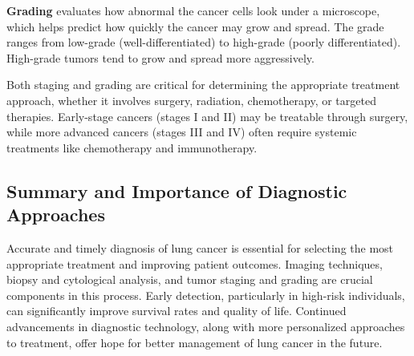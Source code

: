 \textbf{Grading} evaluates how abnormal the cancer cells look under a microscope, which helps predict 
how quickly the cancer may grow and spread. The grade ranges from low-grade (well-differentiated) 
to high-grade (poorly differentiated). High-grade tumors tend to grow and spread more aggressively.

Both staging and grading are critical for determining the appropriate treatment approach, whether it 
involves surgery, radiation, chemotherapy, or targeted therapies. Early-stage cancers (stages I and 
II) may be treatable through surgery, while more advanced cancers (stages III and IV) often require 
systemic treatments like chemotherapy and immunotherapy.


\subsection{Summary and Importance of Diagnostic Approaches}

Accurate and timely diagnosis of lung cancer is essential for selecting the most appropriate 
treatment and improving patient outcomes. Imaging techniques, biopsy and cytological analysis, and 
tumor staging and grading are crucial components in this process. Early detection, particularly in 
high-risk individuals, can significantly improve survival rates and quality of life. Continued 
advancements in diagnostic technology, along with more personalized approaches to treatment, offer 
hope for better management of lung cancer in the future.
